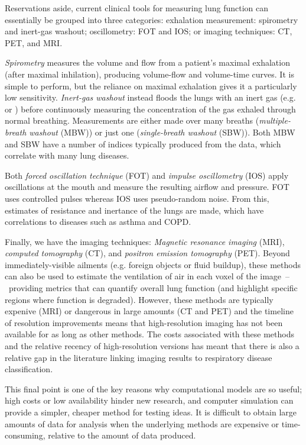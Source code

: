 Reservations aside, current clinical tools for measuring lung function can essentially be grouped
into three categories: exhalation measurement: spirometry and inert-gas washout; oscillometry: FOT
and IOS; or imaging techniques: CT, PET, and MRI.

\textit{Spirometry} measures the volume and flow from a patient's maximal exhalation (after maximal
inhilation), producing volume-flow and volume-time curves. It is simple to perform, but the reliance
on maximal exhalation gives it a particularly low sensitivity. \textit{Inert-gas washout} instead
floods the lungs with an inert gas (e.g.~ or ) before continuously measuring the
concentration of the gas exhaled through normal breathing. Measurements are either made over many
breaths (\textit{multiple-breath washout} (MBW)) or just one (\textit{single-breath washout} (SBW)).
Both MBW and SBW have a number of indices typically produced from the data, which correlate with
many lung diseases.

Both \textit{forced oscillation technique} (FOT) and \textit{impulse oscillometry} (IOS) apply
oscillations at the mouth and measure the resulting airflow and pressure. FOT uses controlled
pulses whereas IOS uses pseudo-random noise. From this, estimates of resistance and inertance of the
lungs are made, which have correlations to diseases such as asthma and COPD.

Finally, we have the imaging techniques: \textit{Magnetic resonance imaging} (MRI), \textit{computed
tomography} (CT), and \textit{positron emission tomography} (PET). Beyond immediately-visible
ailments (e.g. foreign objects or fluid buildup), these methods can also be used to estimate the
ventilation of air in each voxel of the image~--~providing metrics that can quantify overall lung
function (and highlight specific regions where function is degraded). However, these methods are
typically expenive (MRI) or dangerous in large amounts (CT and PET) and the timeline of resolution
improvements means that high-resolution imaging has not been available for as long as other methods.
The costs associated with these methods and the relative recency of high-resolution versions has
meant that there is also a relative gap in the literature linking imaging results to respiratory
disease classification.

This final point is one of the key reasons why computational models are so useful; high costs or low
availability hinder new research, and computer simulation can provide a simpler, cheaper method for
testing ideas. It is difficult to obtain large amounts of data for analysis when the underlying
methods are expensive or time-consuming, relative to the amount of data produced.\footnotemark


